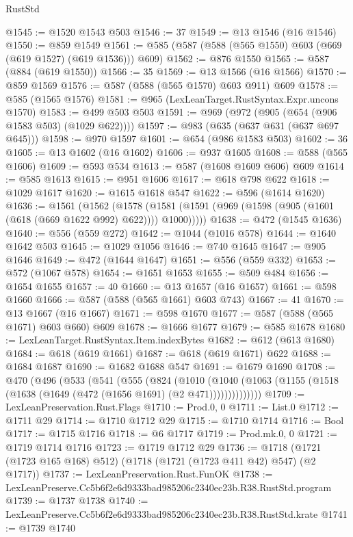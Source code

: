 \begin{lexlean}{RustStd}
\begin{coremodule}
@1545 := @1520 @1543 @503
@1546 := 37
@1549 := @13 @1546 (@16 @1546)
@1550 := @859 @1549
@1561 := @585 (@587 (@588 (@565 @1550) @603 (@669 (@619 @1527) (@619 @1536))) @609)
@1562 := @876 @1550
@1565 := @587 (@884 (@619 @1550))
@1566 := 35
@1569 := @13 @1566 (@16 @1566)
@1570 := @859 @1569
@1576 := @587 (@588 (@565 @1570) @603 @911) @609
@1578 := @585 (@1565 @1576)
@1581 := @965 (LexLeanTarget.RustSyntax.Expr.uncons @1570)
@1583 := @499 @503 @503
@1591 := @969 (@972 (@905 (@654 (@906 @1583 @503) (@1029 @622))))
@1597 := @983 (@635 (@637 @631 (@637 @697 @645)))
@1598 := @970 @1597
@1601 := @654 (@986 @1583 @503)
@1602 := 36
@1605 := @13 @1602 (@16 @1602)
@1606 := @937 @1605
@1608 := @588 (@565 @1606)
@1609 := @593 @534
@1613 := @587 (@1608 @1609 @606) @609
@1614 := @585 @1613
@1615 := @951 @1606
@1617 := @618 @798 @622
@1618 := @1029 @1617
@1620 := @1615 @1618 @547
@1622 := @596 (@1614 @1620)
@1636 := @1561
    (@1562
      (@1578 (@1581 (@1591 (@969 (@1598 (@905 (@1601 (@618 (@669 @1622 @992) @622)))) @1000)))))
@1638 := @472 (@1545 @1636)
@1640 := @556 (@559 @272)
@1642 := @1044 (@1016 @578)
@1644 := @1640 @1642 @503
@1645 := @1029 @1056
@1646 := @740 @1645
@1647 := @905 @1646
@1649 := @472 (@1644 @1647)
@1651 := @556 (@559 @332)
@1653 := @572 (@1067 @578)
@1654 := @1651 @1653
@1655 := @509 @484
@1656 := @1654 @1655
@1657 := 40
@1660 := @13 @1657 (@16 @1657)
@1661 := @598 @1660
@1666 := @587 (@588 (@565 @1661) @603 @743)
@1667 := 41
@1670 := @13 @1667 (@16 @1667)
@1671 := @598 @1670
@1677 := @587 (@588 (@565 @1671) @603 @660) @609
@1678 := @1666 @1677
@1679 := @585 @1678
@1680 := LexLeanTarget.RustSyntax.Item.indexBytes
@1682 := @612 (@613 @1680)
@1684 := @618 (@619 @1661)
@1687 := @618 (@619 @1671) @622
@1688 := @1684 @1687
@1690 := @1682 @1688 @547
@1691 := @1679 @1690
@1708 := @470
    (@496
      (@533
        (@541
          (@555
            (@824
              (@1010
                (@1040 (@1063 (@1155 (@1518 (@1638 (@1649 (@472 (@1656 @1691) (@2 @471))))))))))))))
@1709 := LexLeanPreservation.Rust.Flags
@1710 := Prod.{0, 0}
@1711 := List.{0}
@1712 := @1711 @29
@1714 := @1710 @1712 @29
@1715 := @1710 @1714
@1716 := Bool
@1717 := @1715 @1716
@1718 := @6 @1717
@1719 := Prod.mk.{0, 0}
@1721 := @1719 @1714 @1716
@1723 := @1719 @1712 @29
@1736 := @1718 (@1721 (@1723 @165 @168) @512) (@1718 (@1721 (@1723 @411 @42) @547) (@2 @1717))
@1737 := LexLeanPreservation.Rust.FunOK
@1738 := LexLeanPreserve.Cc5b6f2e6d9333bad985206c2340ec23b.R38.RustStd.program
@1739 := @1737 @1738
@1740 := LexLeanPreserve.Cc5b6f2e6d9333bad985206c2340ec23b.R38.RustStd.krate
@1741 := @1739 @1740

\end{coremodule}
\end{lexlean}
